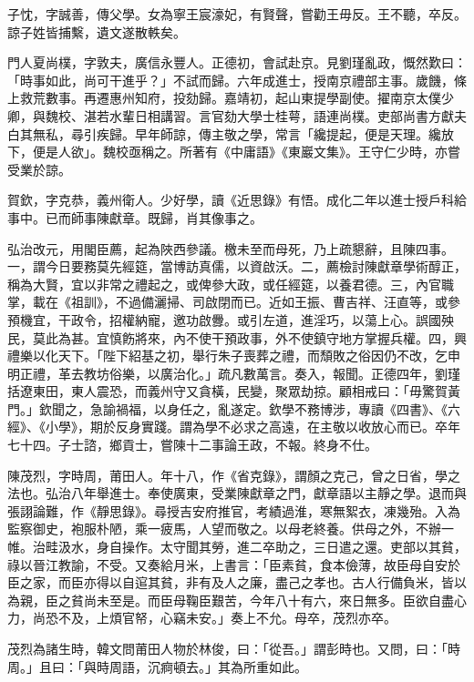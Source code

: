 \begin{pinyinscope}
子忱，字誠善，傳父學。女為寧王宸濠妃，有賢聲，嘗勸王毋反。王不聽，卒反。諒子姓皆捕繫，遺文遂散軼矣。

門人夏尚樸，字敦夫，廣信永豐人。正德初，會試赴京。見劉瑾亂政，慨然歎曰：「時事如此，尚可干進乎？」不試而歸。六年成進士，授南京禮部主事。歲饑，條上救荒數事。再遷惠州知府，投劾歸。嘉靖初，起山東提學副使。擢南京太僕少卿，與魏校、湛若水輩日相講習。言官劾大學士桂萼，語連尚樸。吏部尚書方獻夫白其無私，尋引疾歸。早年師諒，傳主敬之學，常言「纔提起，便是天理。纔放下，便是人欲」。魏校亟稱之。所著有《中庸語》《東巖文集》。王守仁少時，亦嘗受業於諒。

賀欽，字克恭，義州衛人。少好學，讀《近思錄》有悟。成化二年以進士授戶科給事中。已而師事陳獻章。既歸，肖其像事之。

弘治改元，用閣臣薦，起為陜西參議。檄未至而母死，乃上疏懇辭，且陳四事。一，謂今日要務莫先經筵，當博訪真儒，以資啟沃。二，薦檢討陳獻章學術醇正，稱為大賢，宜以非常之禮起之，或俾參大政，或任經筵，以養君德。三，內官職掌，載在《祖訓》，不過備灑掃、司啟閉而已。近如王振、曹吉祥、汪直等，或參預機宜，干政令，招權納寵，邀功啟釁。或引左道，進淫巧，以蕩上心。誤國殃民，莫此為甚。宜慎飭將來，內不使干預政事，外不使鎮守地方掌握兵權。四，興禮樂以化天下。「陛下紹基之初，舉行朱子喪葬之禮，而頹敗之俗因仍不改，乞申明正禮，革去教坊俗樂，以廣治化。」疏凡數萬言。奏入，報聞。正德四年，劉瑾括遼東田，東人震恐，而義州守又貪橫，民變，聚眾劫掠。顧相戒曰：「毋驚賀黃門。」欽聞之，急諭禍福，以身任之，亂遂定。欽學不務博涉，專讀《四書》、《六經》、《小學》，期於反身實踐。謂為學不必求之高遠，在主敬以收放心而已。卒年七十四。子士諮，鄉貢士，嘗陳十二事論王政，不報。終身不仕。

陳茂烈，字時周，莆田人。年十八，作《省克錄》，謂顏之克己，曾之日省，學之法也。弘治八年舉進士。奉使廣東，受業陳獻章之門，獻章語以主靜之學。退而與張詡論難，作《靜思錄》。尋授吉安府推官，考績過淮，寒無絮衣，凍幾殆。入為監察御史，袍服朴陋，乘一疲馬，人望而敬之。以母老終養。供母之外，不辦一帷。治畦汲水，身自操作。太守聞其勞，進二卒助之，三日遣之還。吏部以其貧，祿以晉江教諭，不受。又奏給月米，上書言：「臣素貧，食本儉薄，故臣母自安於臣之家，而臣亦得以自逭其貧，非有及人之廉，盡己之孝也。古人行備負米，皆以為親，臣之貧尚未至是。而臣母鞠臣艱苦，今年八十有六，來日無多。臣欲自盡心力，尚恐不及，上煩官帑，心竊未安。」奏上不允。母卒，茂烈亦卒。

茂烈為諸生時，韓文問莆田人物於林俊，曰：「從吾。」謂彭時也。又問，曰：「時周。」且曰：「與時周語，沉痾頓去。」其為所重如此。


\end{pinyinscope}
